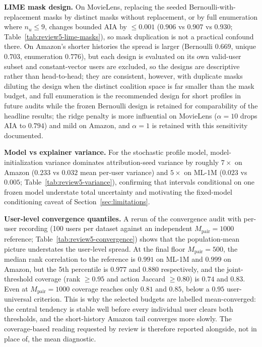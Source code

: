 \documentclass[pdflatex,sn-mathphys-num]{sn-jnl}
\theoremstyle{thmstyleone}
\theoremstyle{thmstyletwo}
\theoremstyle{thmstylethree}
\begin{document}
\textbf{LIME mask design.} On MovieLens, replacing the seeded Bernoulli-with-replacement masks by distinct masks without replacement, or by full enumeration where $n_u\le9$, changes bounded AIA by $\le0.001$ ($0.906$ vs $0.907$ vs $0.930$; Table~\ref{tab:review5-lime-masks}), so mask duplication is not a practical confound there. On Amazon's shorter histories the spread is larger (Bernoulli $0.669$, unique $0.703$, enumeration $0.776$), but each design is evaluated on its own valid-user subset and constant-vector users are excluded, so the designs are descriptive rather than head-to-head; they are consistent, however, with duplicate masks diluting the design when the distinct coalition space is far smaller than the mask budget, and full enumeration is the recommended design for short profiles in future audits while the frozen Bernoulli design is retained for comparability of the headline results; the ridge penalty is more influential on MovieLens ($\alpha=10$ drops AIA to $0.794$) and mild on Amazon, and $\alpha=1$ is retained with this sensitivity documented.

\textbf{Model vs explainer variance.} For the stochastic profile model, model-initialization variance dominates attribution-seed variance by roughly $7\times$ on Amazon ($0.233$ vs $0.032$ mean per-user variance) and $5\times$ on ML-1M ($0.023$ vs $0.005$; Table~\ref{tab:review5-variance}), confirming that intervals conditional on one frozen model understate total uncertainty and motivating the fixed-model conditioning caveat of Section~\ref{sec:limitations}.

\textbf{User-level convergence quantiles.} A rerun of the convergence audit with per-user recording (100 users per dataset against an independent $M_{\mathrm{pair}}=1000$ reference; Table~\ref{tab:review5-convergence}) shows that the population-mean picture understates the user-level spread. At the final floor $M_{\mathrm{pair}}=500$, the median rank correlation to the reference is $0.991$ on ML-1M and $0.999$ on Amazon, but the 5th percentile is $0.977$ and $0.880$ respectively, and the joint-threshold coverage (rank $\ge0.95$ and action Jaccard $\ge0.80$) is $0.74$ and $0.83$. Even at $M_{\mathrm{pair}}=1000$ coverage reaches only $0.81$ and $0.85$, below a $0.95$ user-universal criterion. This is why the selected budgets are labelled mean-converged: the central tendency is stable well before every individual user clears both thresholds, and the short-history Amazon tail converges more slowly. The coverage-based reading requested by review is therefore reported alongside, not in place of, the mean diagnostic.
\end{document}

